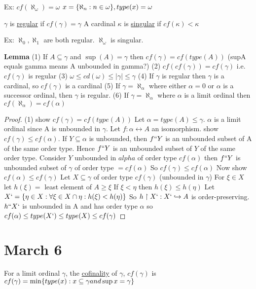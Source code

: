 Ex: $cf(\aleph_\omega) = \omega$
$x = \{\aleph_n : n \in \omega\}, type(x) = \omega$

\dfn $\gamma$ is \underline{regular} if $cf(\gamma) = \gamma$
A cardinal $\kappa$ is \underline{singular} if $cf(\kappa) < \kappa$

Ex: $\aleph_0, \aleph_1$ are both regular.
$\aleph_\omega$ is singular.

\textbf{Lemma}
(1) If $A \subseteq \gamma$ and $\sup(A) = \gamma$ then $cf(\gamma) = cf(type(A))$ (supA equals gamma means A unbounded in gamma?)
(2) $cf(cf(\gamma)) = cf(\gamma)$ i.e. $cf(\gamma)$ is regular
(3) $\omega \leq cd(\omega) \leq |\gamma| \leq \gamma$
(4) If $\gamma$ is regular then $\gamma$ is a cardinal, so $cf(\gamma)$ is a cardinal
(5) If $\gamma = \aleph_\alpha$ where either $\alpha = 0$ or $\alpha$ is a successor ordinal, then $\gamma$ is regular.
(6) If $\gamma = \aleph_\alpha$ where $\alpha$ is a limit ordinal then $cf(\aleph_\alpha) = cf(\alpha)$

\begin{proof}
(1) show $cf(\gamma) = cf(type(A))$
    Let $\alpha = type(A) \leq \gamma$.
    $\alpha$ is a limit ordinal since A is unbounded in $\gamma$.
    Let $f : \alpha \leftrightarrow A$ an isomorphism.
    show $cf(\gamma) \leq cf(\alpha)$.
    If $Y \subseteq \alpha$ is unbounded, then $f``Y$ is an unbounded subset of A of the same order type.
    Hence $f``Y$ is an unbounded subset of $Y$ of the same order type.
    Consider $Y$ unbounded in $alpha$ of order type $cf(\alpha)$ then $f``Y$ is unbounded subset of $\gamma$ of order type $=cf(\alpha)$
    So $cf(\gamma) \leq cf(\alpha)$
    Now show $cf(\alpha) \leq cf(\gamma)$
    Let $X \subseteq \gamma$ of order type $cf(\gamma)$ (unbounded in $\gamma$)
    For $\xi \in X$ let $h(\xi) = $ least element of $A \geq \xi$
    If $\xi < \eta$ then $h(\xi) \leq h(\eta)$
    Let $X` = \{\eta \in X : \forall \xi \in X \cap \eta : h(\xi) < h(\eta)\}$
    So $h \upharpoonright X` : X` \hookrightarrow A$ is order-preserving.
    $h``X`$ is unbounded in A and has order type $\alpha$ so $cf(\alpha) \leq type(X`) \leq type(X) \leq cf(\gamma)$

    \end{proof}

\section{March 6}
For a limit ordinal $\gamma$, the \underline{cofinality} of $\gamma$, $cf(\gamma)$ is
$cf(\gamma) = \min\{type(x):x \subseteq \gamma and \sup x = \gamma\}$

